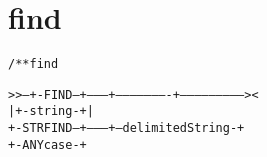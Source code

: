 \section{find}
\begin{shaded}
\begin{alltt}
/** find


   >>--+-FIND--+--------+----------------------+--------------------------><
       |       +-string-+                      |
       +-STRFIND--+---------+--delimitedString-+
                  +-ANYcase-+

\end{alltt}
\end{shaded}
